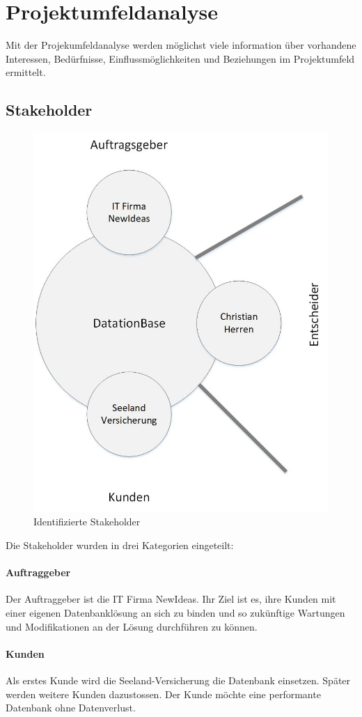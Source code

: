 \documentclass{article}
\begin{document}
\section{Projektumfeldanalyse}
Mit der Projekumfeldanalyse werden möglichst viele information über vorhandene Interessen, Bedürfnisse, Einflussmöglichkeiten und Beziehungen im Projektumfeld ermittelt.
\subsection{Stakeholder}
\begin{figure}[H]
	\centering
  	\includegraphics[width=0.7\linewidth]{images/stakeholder.jpg}
  	\caption{Identifizierte Stakeholder}
 	\label{fig:stakeholder}
\end{figure}
Die Stakeholder wurden in drei Kategorien eingeteilt:
\paragraph{Auftraggeber}
Der Auftraggeber ist die IT Firma NewIdeas. Ihr Ziel ist es, ihre Kunden mit einer eigenen Datenbanklösung an sich zu binden und so zukünftige Wartungen und Modifikationen an der Lösung durchführen zu können.
\paragraph{Kunden}
Als erstes Kunde wird die Seeland-Versicherung die Datenbank einsetzen. Später werden weitere Kunden dazustossen. Der Kunde möchte eine performante Datenbank ohne Datenverlust.
\end{document}
